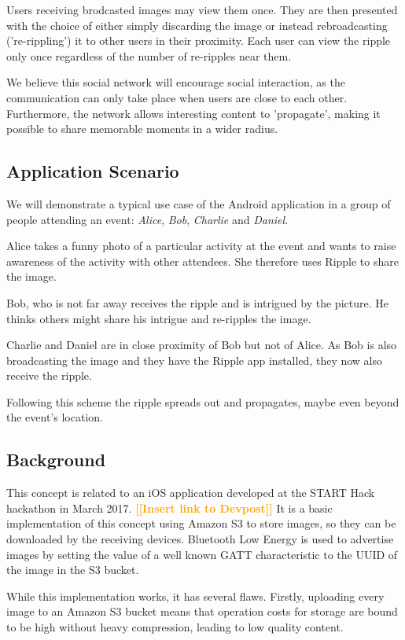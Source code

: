 \documentclass{report}
\newcommand{\todo}[1]{\textsf{\textbf{\textcolor{orange}{[[#1]]}}}}
\begin{document}
Users receiving brodcasted images may view them once. They are then presented with the choice of either simply discarding the image or instead rebroadcasting ('re-rippling') it to other users in their proximity.
Each user can view the ripple only once regardless of the number of re-ripples near them.

We believe this social network will encourage social interaction, as the communication can only take place when users are close to each other. Furthermore, the network allows interesting content to 'propagate', making it possible to share memorable moments in a wider radius.

\subsection{Application Scenario}
We will demonstrate a typical use case of the Android application in a group of people attending an event: \textit{Alice}, \textit{Bob}, \textit{Charlie} and \textit{Daniel}.

Alice takes a funny photo of a particular activity at the event and wants to raise awareness of the activity with other attendees. She therefore uses Ripple to share the image.

Bob, who is not far away receives the ripple and is intrigued by the picture. He thinks others might share his intrigue and re-ripples the image.

Charlie and Daniel are in close proximity of Bob but not of Alice. As Bob is also broadcasting the image and they have the Ripple app installed, they now also receive the ripple.

Following this scheme the ripple spreads out and propagates, maybe even beyond the event's location.

\subsection{Background}
This concept is related to an iOS application developed at the START Hack hackathon in March 2017. \todo{Insert link to Devpost} It is a basic implementation of this concept using Amazon S3 to store images, so they can be downloaded by the receiving devices. Bluetooth Low Energy is used to advertise images by setting the value of a well known GATT characteristic to the UUID of the image in the S3 bucket.

While this implementation works, it has several flaws. Firstly, uploading every image to an Amazon S3 bucket means that operation costs for storage are bound to be high without heavy compression, leading to low quality content.
\end{document}
